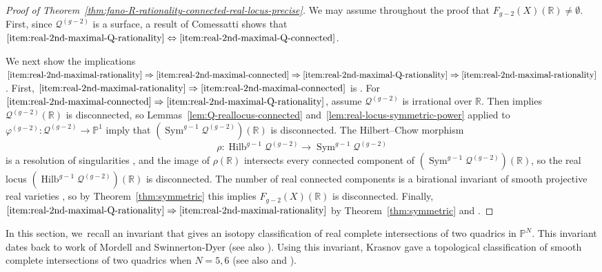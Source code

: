 \documentclass[JEP,XML,SOM,Unicode,NoEqCountersInSection,published]{cedram}
\let\cal\mathcal
\let\bb\mathbb\let\Bbb\mathbb
\theoremstyle{plain}
\theoremstyle{definition}
\DeclareMathOperator{\Hilb}{Hilb}
\DeclareMathOperator{\Sym}{Sym}
\let\phi\varphi
\begin{document}
\begin{proof}[Proof of Theorem~\ref{thm:fano-R-rationality-connected-real-locus-precise}]
We may assume throughout the proof that \hbox{\(F_{g-2}(X)(\bb R)\!\neq\!\emptyset\)}. First, since \(\cal Q^{(g-2)}\) is a surface, a result of Comessatti \cite[pp.\,54--55]{Comessatti1913} shows that \(\eqref{item:real-2nd-maximal-Q-rationality}\Leftrightarrow\eqref{item:real-2nd-maximal-Q-connected}\).

We next show the implications \(\eqref{item:real-2nd-maximal-rationality}\Rightarrow\eqref{item:real-2nd-maximal-connected}\Rightarrow\eqref{item:real-2nd-maximal-Q-rationality}\Rightarrow\eqref{item:real-2nd-maximal-rationality}\).
First, \(\eqref{item:real-2nd-maximal-rationality}\Rightarrow\eqref{item:real-2nd-maximal-connected}\) is \cite[Th.\,13.3]{DK81}.
For \(\eqref{item:real-2nd-maximal-connected}\Rightarrow\eqref{item:real-2nd-maximal-Q-rationality}\), assume \(\cal Q^{(g-2)}\) is irrational over \(\bb R\). Then \cite{Comessatti1913} implies \(\cal Q^{(g-2)}(\bb R)\) is disconnected, so Lemmas~\ref{lem:Q-reallocus-connected} and~\ref{lem:real-locus-symmetric-power} applied to \hbox{\(\phi^{(g-2)}\colon \cal Q^{(g-2)}\!\to\! \bb P^1\)} imply that \((\Sym^{g-1}\cal Q^{(g-2)})(\bb R)\) is disconnected. The Hilbert--Chow morphism
\[
\rho\colon \Hilb^{g-1}\cal Q^{(g-2)} \to \Sym^{g-1}\cal Q^{(g-2)}
\]
is a resolution of singularities \cite{Fogarty68}, and the image of \(\rho(\bb R)\) intersects every connected component of \((\Sym^{g-1}\cal Q^{(g-2)})(\bb R)\), so the real locus \((\Hilb^{g-1}\cal Q^{(g-2)})(\bb R)\) is disconnected. The number of real connected components is a birational invariant of smooth projective real varieties \cite[Th.\,13.3]{DK81},
so by Theorem~\ref{thm:symmetric} this implies \(F_{g-2}(X)(\bb R)\) is disconnected.
Finally, \(\eqref{item:real-2nd-maximal-Q-rationality}\Rightarrow\eqref{item:real-2nd-maximal-rationality}\) by Theorem~\ref{thm:symmetric} and \cite{Mattuck69}.
\end{proof}

\label{sec:krasnov}

In this section, we~recall an invariant that gives an isotopy classification of real complete intersections of two quadrics in \(\bb P^N\).
This invariant dates back to work of Mordell \cite[\S 3]{Mordell59} and Swinnerton-Dyer \cite[p.\,268]{SD64} (see also \cite[\S 10]{CTSSD2}).
Using this invariant, Krasnov gave a topological classification of smooth complete intersections of two quadrics when \(N=5, 6\)
\cite{krasnov-biquadrics} (see also \cite[\S 11.2]{HT-intersection-quadrics} and \cite[\S 4.1]{HassettKoll'arTschinkel}).
\end{document}
